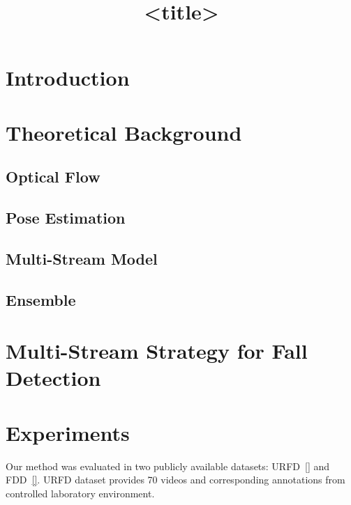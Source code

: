 \documentclass{article}
\title{<title>}
\begin{document}
\ninept
%
\maketitle
%
\begin{abstract}
\end{abstract}
%
\begin{keywords}
\end{keywords}
%
\section{Introduction}
\label{sec:intro}

\section{Theoretical Background}
\label{sec:back}

\subsection{Optical Flow}
\label{ssec:featSelection}

\subsection{Pose Estimation}
\label{ssec:featSelection}

\subsection{Multi-Stream Model}
\label{ssec:MModel}

\subsection{Ensemble}
\label{ssec:esb}

\section{Multi-Stream Strategy for Fall Detection}
\label{sec:model}

\section{Experiments}
\label{sec:experiments}

Our method was evaluated in two publicly available datasets: URFD~\ref{} and FDD~\ref{}. URFD dataset provides 70 videos and corresponding annotations from controlled laboratory environment.
\end{document}
